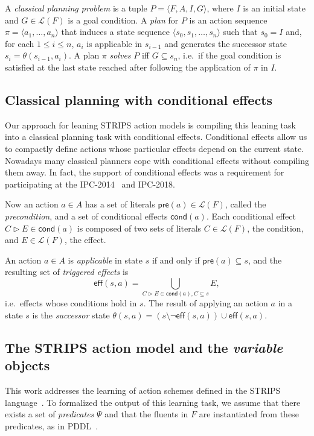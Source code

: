 \documentclass[letterpaper]{article} %
\newcommand{\tup}[1]{{\langle #1 \rangle}}
\newcommand{\pre}{\mathsf{pre}}     %
\newcommand{\eff}{\mathsf{eff}}     %
\newcommand{\cond}{\mathsf{cond}}   %
\begin{document}
A {\em classical planning problem} is a tuple $P=\tup{F,A,I,G}$, where $I$ is an initial state and $G\in\mathcal{L}(F)$ is a goal condition. A {\em plan} for $P$ is an action sequence $\pi=\tup{a_1, \ldots, a_n}$ that induces a state sequence $\tup{s_0, s_1, \ldots, s_n}$ such that $s_0=I$ and, for each {\small $1\leq i\leq n$}, $a_i$ is applicable in $s_{i-1}$ and generates the successor state $s_i=\theta(s_{i-1},a_i)$. A plan $\pi$ {\em solves} $P$ iff $G\subseteq s_n$, i.e.~if the goal condition is satisfied at the last state reached after following the application of $\pi$ in $I$.


\subsection{Classical planning with conditional effects}
Our approach for leaning STRIPS action models is compiling this leaning task into a classical planning task with conditional effects. Conditional effects allow us to compactly define actions whose particular effects depend on the current state. Nowadays many classical planners cope with conditional effects without compiling them away. In fact, the support of conditional effects was a requirement for participating at the IPC-2014~\cite{vallati:IPC:AIM2015} and IPC-2018.

Now an action $a\in A$ has a set of literals $\pre(a)\in\mathcal{L}(F)$, called the {\em precondition}, and a set of conditional effects $\cond(a)$. Each conditional effect $C\rhd E\in\cond(a)$ is composed of two sets of literals $C\in\mathcal{L}(F)$, the condition, and $E\in\mathcal{L}(F)$, the effect.

An action $a\in A$ is {\em applicable} in state $s$ if and only if $\pre(a)\subseteq s$, and the resulting set of {\em triggered effects} is
\[
\eff(s,a)=\bigcup_{C\rhd E\in\cond(a),C\subseteq s} E,
\]
i.e.~effects whose conditions hold in $s$. The result of applying an action $a$ in a state $s$ is the {\em successor} state $\theta(s,a)=(s\setminus \neg \eff(s,a))\cup\eff(s,a)$.


\subsection{The STRIPS action model and the {\em variable} objects}
This work addresses the learning of action schemes defined in the STRIPS language~\cite{fikes1971strips}. To formalized the output of this learning task, we assume that there exists a set of {\em predicates} $\Psi$ and that the fluents in $F$ are instantiated from these predicates, as in PDDL~\cite{mcdermott1998pddl,fox2003pddl2}.
\end{document}
